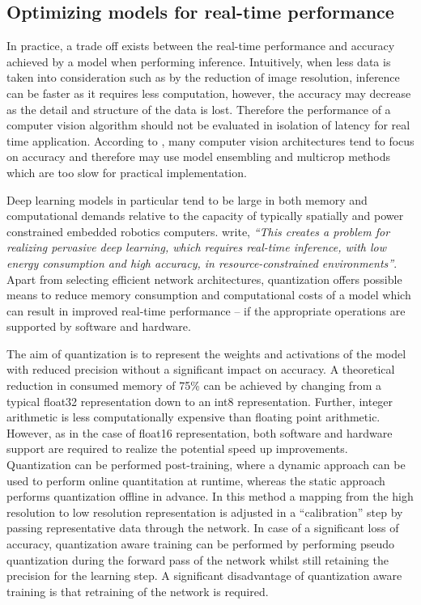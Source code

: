 \documentclass[a4paper,twoside,12pt]{report}
\begin{document}
\newpage
\subsection{Optimizing models for real-time performance}

In practice, a trade off exists between the real-time performance and accuracy achieved by a model when performing inference. Intuitively, when less data is taken into consideration such as by the reduction of image resolution, inference can be faster as it requires less computation, however, the accuracy may decrease as the detail and structure of the data is lost. Therefore the performance of a computer vision algorithm should not be evaluated in isolation of latency for real time application. According to \cite{speedacc}, many computer vision architectures tend to focus on accuracy and therefore may use model ensembling and multicrop methods which are too slow for practical implementation.

Deep learning models in particular tend to be large in both memory and computational demands relative to the capacity of typically spatially and power constrained embedded robotics computers. \cite{quantization} write, \textit{``This creates a problem for realizing pervasive deep learning, which requires real-time inference, with low energy consumption and high accuracy, in resource-constrained environments''}. Apart from selecting efficient network architectures, quantization offers possible means to reduce memory consumption and computational costs of a model which can result in improved real-time performance -- if the appropriate operations are supported by software and hardware.

The aim of quantization is to represent the weights and activations of the model with reduced precision without a significant impact on accuracy. A theoretical reduction in consumed memory of 75\% can be achieved by changing from a typical float32 representation down to an int8 representation. Further, integer arithmetic is less computationally expensive than floating point arithmetic. However, as in the case of float16 representation, both software and hardware support are required to realize the potential speed up improvements. Quantization can be performed post-training, where a dynamic approach can be used to perform online quantitation at runtime, whereas the static approach performs quantization offline in advance. In this method a mapping from the high resolution to low resolution representation is adjusted in a ``calibration'' step by passing representative data through the network. In case of a significant loss of accuracy, quantization aware training can be performed by performing pseudo quantization during the forward pass of the network whilst  still retaining the precision for the learning step. A significant disadvantage of quantization aware training is that retraining of the network is required. \citep{quantization}
\end{document}
